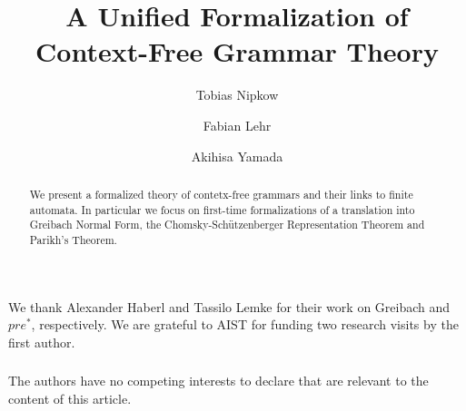 \documentclass[runningheads]{llncs}
\newcommand{\prestar}{$\mathit{pre}^*$}
\begin{document}
\title{A Unified Formalization of Context-Free Grammar Theory}

\author{Tobias Nipkow \and
Fabian Lehr \and
Akihisa Yamada}
%


\maketitle

\begin{abstract}
We present a formalized theory of contetx-free grammars and
their links to finite automata. In particular we focus on first-time
formalizations of a translation into Greibach Normal Form, the Chomsky-Sch\"utzenberger Representation Theorem and Parikh's Theorem.

\end{abstract}


%



\begin{credits}
\subsubsection{\ackname}
We thank Alexander Haberl and Tassilo Lemke for their work on Greibach and \prestar, respectively.
We are grateful to AIST for funding two research visits by the first author.
\subsubsection{\discintname}
The authors have no competing interests to declare that are relevant to the content of this article.
\end{credits}



\end{document}
